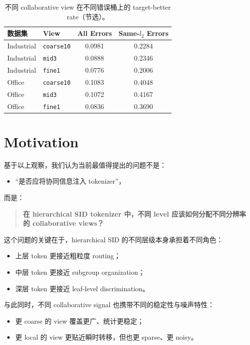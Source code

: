 \documentclass[11pt]{article}
\begin{document}
\begin{table}[t]
  \centering
  \caption{不同 collaborative view 在不同错误桶上的 target-better rate（节选）。}
  \small
  \begin{tabular}{l l S[table-format=1.4] S[table-format=1.4]}
    \toprule
    数据集 & View & {All Errors} & {Same-$l_2$ Errors} \\
    \midrule
    Industrial & \texttt{coarse10} & 0.0981 & 0.2284 \\
    Industrial & \texttt{mid3}     & 0.0888 & 0.2346 \\
    Industrial & \texttt{fine1}    & 0.0776 & 0.2006 \\
    \midrule
    Office     & \texttt{coarse10} & 0.1083 & 0.4048 \\
    Office     & \texttt{mid3}     & 0.1072 & 0.4167 \\
    Office     & \texttt{fine1}    & 0.0836 & 0.3690 \\
    \bottomrule
  \end{tabular}
\end{table}

\section{Motivation}

基于以上观察，我们认为当前最值得提出的问题不是：
\begin{itemize}
  \item “是否应将协同信息注入 tokenizer”，
\end{itemize}
而是：
\begin{quote}
\textbf{在 hierarchical SID tokenizer 中，不同 level 应该如何分配不同分辨率的 collaborative views？}
\end{quote}

这个问题的关键在于，hierarchical SID 的不同层级本身承担着不同角色：
\begin{itemize}
  \item 上层 token 更接近粗粒度 routing；
  \item 中层 token 更接近 subgroup organization；
  \item 深层 token 更接近 leaf-level discrimination。
\end{itemize}

与此同时，不同 collaborative signal 也携带不同的稳定性与噪声特性：
\begin{itemize}
  \item 更 coarse 的 view 覆盖更广、统计更稳定；
  \item 更 local 的 view 更贴近瞬时转移，但也更 sparse、更 noisy。
\end{itemize}
\end{document}
